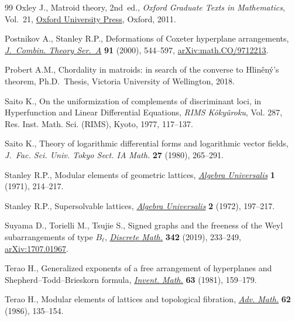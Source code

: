 \documentclass[pdftex]{sigma}
\numberwithin{equation}{section}
\begin{document}
\begin{thebibliography}{99}
Oxley J., Matroid theory, 2nd~ed., \textit{Oxford Graduate Texts in Mathematics},
 Vol.~21, \href{https://doi.org/10.1093/acprof:oso/9780198566946.001.0001}{Oxford University Press}, Oxford, 2011.

Postnikov A., Stanley R.P., Deformations of {C}oxeter hyperplane arrangements,
 \href{https://doi.org/10.1006/jcta.2000.3106}{\textit{J.~Combin. Theory Ser.~A}} \textbf{91} (2000), 544--597,
 \href{https://arxiv.org/abs/math.CO/9712213}{arXiv:math.CO/9712213}.

Probert A.M., Chordality in matroids: in search of the converse to
 {H}lin\v{e}n\'y's theorem, Ph.D.~Thesis, {V}ictoria University of Wellington, 2018.

Saito K., On the uniformization of complements of discriminant loci, in
 Hyperfunction and Linear Differential Equations, \textit{RIMS K\^oky\^uroku},
 Vol. 287, Res. Inst. Math. Sci. (RIMS), Kyoto, 1977, 117--137.

Saito K., Theory of logarithmic differential forms and logarithmic vector
 fields, \textit{J.~Fac. Sci. Univ. Tokyo Sect. IA Math.} \textbf{27} (1980),
 265--291.

Stanley R.P., Modular elements of geometric lattices, \href{https://doi.org/10.1007/BF02944981}{\textit{Algebra
 Universalis}} \textbf{1} (1971), 214--217.

Stanley R.P., Supersolvable lattices, \href{https://doi.org/10.1007/BF02945028}{\textit{Algebra Universalis}} \textbf{2}
 (1972), 197--217.

Suyama D., Torielli M., Tsujie S., Signed graphs and the freeness of the {W}eyl
 subarrangements of type {$B_\ell$}, \href{https://doi.org/10.1016/j.disc.2018.09.029}{\textit{Discrete Math.}} \textbf{342}
 (2019), 233--249, \href{https://arxiv.org/abs/1707.01967}{arXiv:1707.01967}.

Terao H., Generalized exponents of a free arrangement of hyperplanes and
 {S}hepherd--{T}odd--{B}rieskorn formula, \href{https://doi.org/10.1007/BF01389197}{\textit{Invent. Math.}} \textbf{63}
 (1981), 159--179.

Terao H., Modular elements of lattices and topological fibration, \href{https://doi.org/10.1016/0001-8708(86)90097-6}{\textit{Adv.
 Math.}} \textbf{62} (1986), 135--154.


\end{thebibliography}
\end{document}
